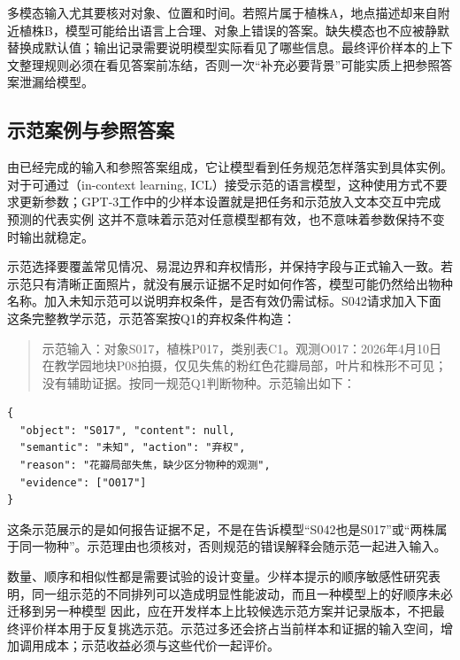 多模态输入尤其要核对对象、位置和时间。若照片属于植株A，地点描述却来自附近植株B，模型可能给出语言上合理、对象上错误的答案。缺失模态也不应被静默替换成默认值；输出记录需要说明模型实际看见了哪些信息。最终评价样本的上下文整理规则必须在看见答案前冻结，否则一次“补充必要背景”可能实质上把参照答案泄漏给模型。

\Needspace{125mm}
\subsection{示范案例与参照答案}
\label{sec:knowledge-acquisition-demonstrations}

由已经完成的输入和参照答案组成，它让模型看到任务规范怎样落实到具体实例。对于可通过（in-context learning, ICL）接受示范的语言模型，这种使用方式不要求更新参数；GPT-3工作中的少样本设置就是把任务和示范放入文本交互中完成预测的代表实例
这并不意味着示范对任意模型都有效，也不意味着参数保持不变时输出就稳定。

示范选择要覆盖常见情况、易混边界和弃权情形，并保持字段与正式输入一致。若示范只有清晰正面照片，就没有展示证据不足时如何作答，模型可能仍然给出物种名称。加入未知示范可以说明弃权条件，是否有效仍需试标。S042请求加入下面这条完整教学示范，示范答案按Q1的弃权条件构造：

\begin{quote}
  示范输入：对象S017，植株P017，类别表C1。观测O017：2026年4月10日在教学园地块P08拍摄，仅见失焦的粉红色花瓣局部，叶片和株形不可见；没有辅助证据。按同一规范Q1判断物种。示范输出如下：
\end{quote}
\begin{lstlisting}[style=book code,numbers=none]
{
  "object": "S017", "content": null,
  "semantic": "未知", "action": "弃权",
  "reason": "花瓣局部失焦，缺少区分物种的观测",
  "evidence": ["O017"]
}
\end{lstlisting}

这条示范展示的是如何报告证据不足，不是在告诉模型“S042也是S017”或“两株属于同一物种”。示范理由也须核对，否则规范的错误解释会随示范一起进入输入。

数量、顺序和相似性都是需要试验的设计变量。少样本提示的顺序敏感性研究表明，同一组示范的不同排列可以造成明显性能波动，而且一种模型上的好顺序未必迁移到另一种模型
因此，应在开发样本上比较候选示范方案并记录版本，不把最终评价样本用于反复挑选示范。示范过多还会挤占当前样本和证据的输入空间，增加调用成本；示范收益必须与这些代价一起评价。

